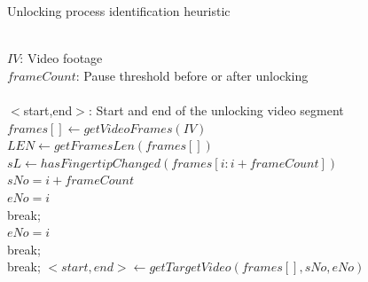    \begin{algorithm}[!t]
        \centering
        \caption{Unlocking process identification heuristic}
        \label{alg:recognition}
        \begin{algorithmic}[1]
            \REQUIRE~~\\
                $IV$: Video footage  \\
                $frameCount$: Pause threshold before or after unlocking\\
            \ENSURE~~\\
                $<$start,end$>$: Start and end of the unlocking video segment \\
            \STATE $frames[] \leftarrow getVideoFrames(IV)$ \\
            \STATE $LEN \leftarrow getFramesLen(frames[])$ \\
                \STATE $sL \leftarrow hasFingertipChanged(frames[i:i+frameCount])$ \\
                    \STATE $sNo=i+frameCount$ \\
                            \STATE $eNo=i$ \\
                            \STATE break; \\
                            \STATE $eNo=i$ \\
                            \STATE break; \\
                        \ENDIF
                    \ENDFOR
                    \STATE break;
                \ENDIF
            \ENDFOR
            \STATE $<start, end> \leftarrow getTargetVideo(frames[],sNo,eNo)$
        \end{algorithmic}
    \end{algorithm}

